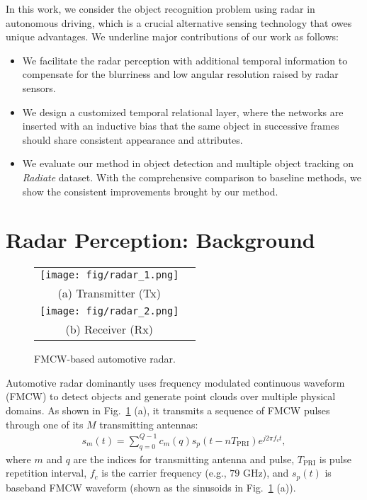 \documentclass[10pt,twocolumn,letterpaper]{article}
\begin{document}
In this work, we consider the object recognition problem using radar in autonomous driving, which is a crucial alternative sensing technology that owes unique advantages. We underline major contributions of our work as follows:
\vspace{-2mm}
\begin{itemize}
    \item We facilitate the radar perception with additional temporal information to compensate for the blurriness and low angular resolution raised by radar sensors.
    \vspace{-2mm}
    \item We design a customized temporal relational layer, where the networks are inserted with an inductive bias that the same object in successive frames should share consistent appearance and attributes.
    \vspace{-2mm}
    \item We evaluate our method in object detection and multiple object tracking on \textit{Radiate} dataset. With the comprehensive comparison to baseline methods, we show the consistent improvements brought by our method.
\end{itemize}



\vspace{-3mm}
\section{Radar Perception: Background}

\begin{figure}[t]
   \begin{center}
   \begin{tabular}{cc}
   \texttt{[image: fig/radar\_1.png]} \\
   (a) Transmitter (Tx) \\
   \texttt{[image: fig/radar\_2.png]} \\
   (b) Receiver (Rx)
   \end{tabular}
   \caption{FMCW-based automotive radar.} 
   \label{fig:FMCW}
   \end{center}
   \vspace{-8mm}
\end{figure}

Automotive radar dominantly uses frequency modulated continuous waveform (FMCW) to detect objects and generate point clouds over multiple physical domains. As shown in Fig.~\ref{fig:FMCW} (a), it transmits a sequence of FMCW pulses through one of its $M$ transmitting antennas:
\begin{align}\label{st}
s_m(t) = \sum\limits_{q=0}^{Q-1} c_m(q) s_p\left(t-nT_{\text{PRI}} \right) e^{j 2\pi f_c t},
\end{align}
where $m$ and $q$ are the indices for transmitting antenna and pulse, $T_{\text{PRI}}$ is pulse repetition interval, $f_c$ is the carrier frequency (e.g., $79$ GHz), and $s_p(t)$ is baseband FMCW waveform (shown as the sinusoids in Fig.~\ref{fig:FMCW} (a)).
\end{document}
